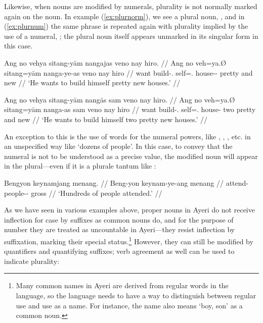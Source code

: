 \xe

Likewise, when nouns are modified by numerals, plurality is not 
normally marked again on the noun. In example (\ref{ex:plurnorm}), we see a 
plural noun, , and in (\ref{ex:plurnum}) the same phrase 
is repeated again with plurality implied by the use of a numeral, 
; the plural noun itself appears unmarked in its singular 
form in this case.

\pex
\a\label{ex:plurnorm}\begingl
	\gla Ang no vehya sitang-yām nangajas veno nay hiro. //
	\glb Ang no veh=ya.Ø sitang=yām nanga-ye-as veno nay hiro //
	\glc \AgtT{} want build-\TsgM.\Top{} self=\TsgM{}.\Dat{} 
		house-\Pl{}-\Parg{} pretty and new //
	\glft `He wants to build himself pretty new houses.' //
\endgl

\a\label{ex:plurnum}\begingl
	\gla Ang no vehya sitang-yām nangās sam veno nay hiro. //
	\glb Ang no veh=ya.Ø sitang=yām nanga-as sam veno nay hiro //
	\glc \AgtT{} want build-\TsgM.\Top{} self=\TsgM{}.\Dat{} house-\Parg{} 
		two pretty and new //
	\glft `He wants to build himself two pretty new houses.' //
\endgl

\xe

An exception to this is the use of words for the numeral powers, 
like , , 
, etc. in an unspecified way like `dozens 
of people'. In this case, to convey that the numeral is not to be understood as 
a precise value, the modified noun will appear in the plural---even if 
it is a plurale tantum like :

\ex\begingl
	\gla Bengyon keynamjang menang. //
	\glb Beng-yon keynam-ye-ang menang //
	\glc attend-\TsgN{} people-\Pl{}-\Aarg{} gross //
	\glft `Hundreds of people attended.' //
\endgl\xe

%
As we have seen in various examples above, proper nouns in Ayeri do not 
receive inflection for case by suffixes as common nouns do, and for the 
purpose of number they are treated as uncountable in Ayeri---they resist 
inflection by suffixation, marking their special status.\footnote{Many common 
names in Ayeri are derived from regular words in the language, so the language 
needs to have a way to distinguish between regular use and use as a name. For 
instance, the name  also means `boy, son' as a common noun.} 
However, they can still be modified by quantifiers and quantifying suffixes; 
verb agreement as well can be used to indicate plurality:

